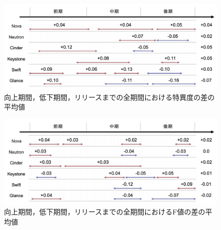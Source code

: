 \documentclass[submit]{ipsj}
\begin{document}
\begin{figure}[t]
\begin{center}
    \includegraphics[width=1.0\textwidth]{Uenaka_fig/RQ2_result/review_S.pdf}
    \caption{向上期間，低下期間，リリースまでの全期間における特異度の差の平均値}
    \label{fig:review_prepare_S}
\end{center}
\end{figure}

\begin{figure}[t]
\begin{center}
    \includegraphics[width=1.0\textwidth]{Uenaka_fig/RQ2_result/review_F.pdf}
    \caption{向上期間，低下期間，リリースまでの全期間におけるF値の差の平均値}
    \label{fig:review_prepare_F}
\end{center}
\end{figure}
\end{document}
